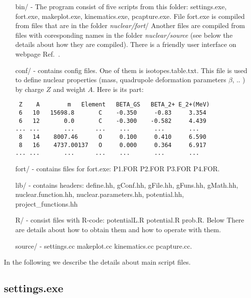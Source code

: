 \documentclass[preprint,review,12pt]{elsarticle}
\begin{document}
  \begin{itemize}
    \setlength\itemsep{0em}
    \item[bin/]    - The program consist of five scripts from this folder: settings.exe, fort.exe, makeplot.exe, kinematics.exe, pcapture.exe. File fort.exe is compiled from files that are in the folder \textit{nuclear/fort}/ Another files are compiled from files with coresponding names in the folder \textit{nuclear/source} (see below the details about how they are compiled). There is a friendly user interface on webpage Ref.~\cite{WebInterface}. 
    \item[conf/]   - contains config files. One of them is isotopes.table.txt. This file is used to define nuclear properties (mass, quadrupole deformation parameters $\beta$, .. ) by charge $Z$ and weight $A$. Here is its part:
\begin{verbatim}
 Z    A        m   Element   BETA_GS   BETA_2+ E_2+(MeV)
 6   10   15698.8       C    -0.350     -0.83     3.354
 6   12       0.0       C    -0.300    -0.582     4.439
... ...       ...      ...    ...       ...       ...
 8   14    8007.46      O     0.100     0.410     6.590
 8   16    4737.00137   O     0.000     0.364     6.917
... ...       ...      ...    ...       ...       ...
\end{verbatim}
    \item[fort/]   - contains files for fort.exe: P1.FOR P2.FOR P3.FOR P4.FOR. 
    \item[lib/]    - contains headers: define.hh, gConf.hh, gFile.hh, gFuns.hh, gMath.hh, nuclear.function.hh, nuclear.parameters.hh, potential.hh, project\_functions.hh
    \item[R/]      - consist files with R-code: potentialL.R  potential.R  prob.R. Below There are details about how to obtain them and how to operate with them.
    \item[source/] - settings.cc makeplot.cc  kinematics.cc pcapture.cc.   
  \end{itemize}
 
 In the following we describe the details about main script files.

  \subsection{settings.exe}
  \label{sec:settings}
\end{document}
